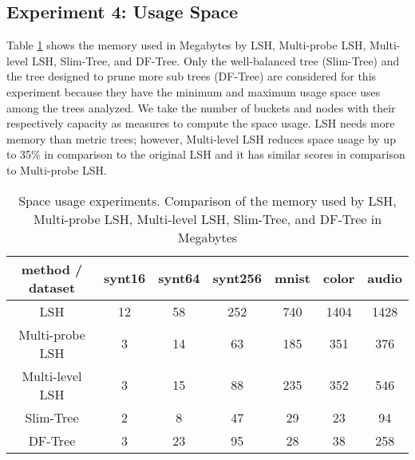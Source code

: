 \subsection{Experiment 4: Usage Space}

Table \ref{spaceusage} shows the memory used in Megabytes by LSH, Multi-probe LSH, Multi-level LSH, Slim-Tree, and DF-Tree.  Only the well-balanced tree (Slim-Tree) and the tree designed to prune more sub trees (DF-Tree) are considered for this experiment because they have the minimum and maximum usage space uses among the trees analyzed.  We take the number of buckets and nodes with their respectively capacity  as measures to compute the space usage. LSH needs more memory than metric trees; however, Multi-level LSH reduces space usage by up to 35\% in comparison to the original LSH and it has similar scores in comparison to Multi-probe LSH. 

\begin{table}[htbp]

\begin{footnotesize}
    \centering
\begin{tabular}{|c|c|c|c|c|c|c|}
  \hline
  method  / dataset & synt16 & synt64 & synt256 & mnist & color & audio \\ \hline
    LSH             & 12 & 58 & 252 & 740 & 1404 & 1428 \\
    Multi-probe LSH & 3 & 14 & 63 & 185 & 351 & 376 \\
    Multi-level LSH & 3 & 15 & 88 & 235 & 352 & 546 \\
    Slim-Tree & 2 & 8 & 47 & 29 & 23 & 94 \\
    DF-Tree & 3 & 23 & 95 & 28 & 38 & 258 \\
  \hline
\end{tabular}
\end{footnotesize}
    \caption{Space usage experiments. Comparison of the memory used by LSH, Multi-probe LSH, Multi-level LSH, Slim-Tree, and DF-Tree in Megabytes}
  \label{spaceusage}
\end{table}
